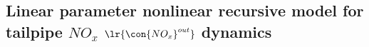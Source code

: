 \subsection{Linear parameter nonlinear recursive model for tailpipe $NO_x$ $\lr{\con{NO_x}^{out}}$ dynamics}
